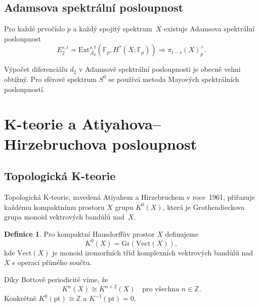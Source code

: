 \documentclass[12pt,a4paper]{article}
\theoremstyle{plain}
\theoremstyle{definition}
\newtheorem{definition}[theorem]{Definice}
\theoremstyle{remark}
\begin{document}
\subsection{Adamsova spektr\'{a}ln\'{i} posloupnost}

Pro ka\v{z}d\'{e} prvo\v{c}\'{i}slo $p$ a ka\v{z}d\'{y} spojit\'{y} spektrum~$X$
existuje Adamsova spektr\'{a}ln\'{i} posloupnost
\begin{equation}
\label{eq:adams}
E_2^{s,t} = \mathrm{Ext}^{s,t}_{\mathcal{A}_p}(\mathbb{F}_p, H^*(X; \mathbb{F}_p)) \Longrightarrow \pi_{t-s}(X)_p^{\wedge}.
\end{equation}

V\'{y}po\v{c}et diferenci\'{a}lu $d_2$ v Adamsov\v{e} spektr\'{a}ln\'{i}
posloupnosti je obecn\v{e} velmi obt\'{i}\v{z}n\'{y}. Pro sf\'{e}rov\'{e} spektrum
$S^0$ se pou\v{z}\'{i}v\'{a} metoda Mayov\'{y}ch spektr\'{a}ln\'{i}ch posloupnost\'{i}.

\section{K-teorie a Atiyahova--Hirzebruchova posloupnost}
\label{sec:k_teorie}

\subsection{Topologick\'{a} K-teorie}

Topologick\'{a} K-teorie, zaveden\'{a} Atiyahem a Hirzebruchem v roce~1961,
p\v{r}i\v{r}azuje ka\v{z}d\'{e}mu kompaktn\'{i}mu prostoru $X$ grupu $K^0(X)$,
kter\'{a} je Grothendieckova grupa monoid vektrov\'{y}ch band\r{u}l\r{u} nad~$X$.

\begin{definition}
Pro kompaktn\'{i} Hausdorff\r{u}v prostor $X$ definujeme
\[
K^0(X) = \mathrm{Gr}(\mathrm{Vect}(X)),
\]
kde $\mathrm{Vect}(X)$ je monoid izomorfn\'{i}ch t\v{r}\'{i}d komplexn\'{i}ch
vektrov\'{y}ch band\r{u}l\r{u} nad $X$ s operac\'{i} p\v{r}\'{i}m\'{e}ho sou\v{c}tu.
\end{definition}

D\'{i}ky Bottov\v{e} periodicit\v{e} v\'{i}me, \v{z}e
\begin{equation}
\label{eq:bott}
K^n(X) \cong K^{n+2}(X) \quad \text{pro v\v{s}echna } n \in \mathbb{Z}.
\end{equation}
Konkr\'{e}tn\v{e} $K^0(\mathrm{pt}) \cong \mathbb{Z}$ a $K^{-1}(\mathrm{pt}) = 0$.
\end{document}
